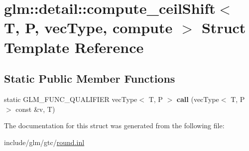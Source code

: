 \hypertarget{structglm_1_1detail_1_1compute__ceilShift}{}\section{glm\+:\+:detail\+:\+:compute\+\_\+ceil\+Shift$<$ T, P, vec\+Type, compute $>$ Struct Template Reference}
\label{structglm_1_1detail_1_1compute__ceilShift}
\subsection*{Static Public Member Functions}
\begin{DoxyCompactItemize}
\item 
\mbox{\label{structglm_1_1detail_1_1compute__ceilShift_a5b16bf873601c2400f4914ad609df30d}} 
static G\+L\+M\+\_\+\+F\+U\+N\+C\+\_\+\+Q\+U\+A\+L\+I\+F\+I\+ER vec\+Type$<$ T, P $>$ {\bfseries call} (vec\+Type$<$ T, P $>$ const \&v, T)
\end{DoxyCompactItemize}


The documentation for this struct was generated from the following file\+:\begin{DoxyCompactItemize}
\item 
include/glm/gtc/\hyperlink{round_8inl}{round.\+inl}\end{DoxyCompactItemize}
